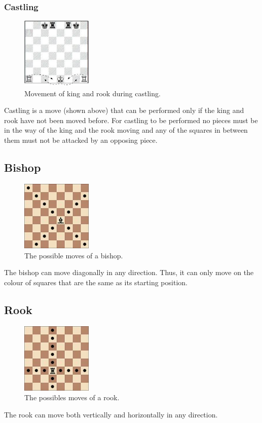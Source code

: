 \documentclass[twoside, 12pt]{report}
\begin{document}
\subsubsection{Castling}
\begin{figure}[H]
\centering
	\includegraphics[width=0.3\textwidth]{images/boards/castling}
	\caption{Movement of king and rook during castling.}
\end{figure}
Castling is a move (shown above) that can be performed only if the king and rook have not been moved before. For castling to be performed no pieces must be in the way of the king and the rook moving and any of the squares in between them must not be attacked by an opposing piece.
\subsection{Bishop}
\begin{figure}[H]
\centering
	\includegraphics[width=0.3\textwidth]{images/boards/bishop_movement}
	\caption{The possible moves of a bishop.}
\end{figure}
The bishop can move diagonally in any direction. Thus, it can only move on the colour of squares that are the same as its starting position.	
\subsection{Rook}
\begin{figure}[H]
\centering
	\includegraphics[width=0.3\textwidth]{images/boards/rook_movement}
	\caption{The possibles moves of a rook.}
\end{figure}
The rook can move both vertically and horizontally in any direction.
\end{document}
